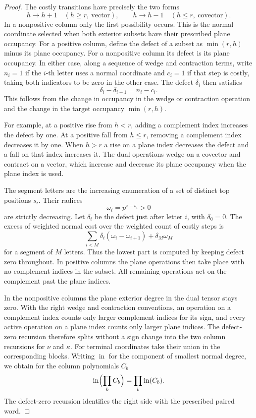 \begin{proof}
The costly transitions have precisely the two forms
\[
 h\longrightarrow h+1\quad(h\ge r,\ \text{vector}),\qquad h\longrightarrow h-1\quad(h\le r,\ \text{covector}).
\]
In a nonpositive
column only the first possibility occurs. This is the normal
coordinate selected when both exterior subsets have their
prescribed plane occupancy. For a positive column, define the
defect of a subset as \(\min(r,h)\) minus its plane occupancy.
For a nonpositive column its defect is its plane occupancy.
In either case, along a sequence of wedge and contraction
terms, write \(n_i=1\) if the \(i\)-th letter
uses a normal coordinate and \(c_i=1\) if that step is
costly, taking both indicators to be zero in the other
case. The defect \(\delta_i\) then satisfies
\[
                    \delta_i-\delta_{i-1}=n_i-c_i .
\]
This follows from the change in occupancy in the wedge
or contraction operation and the change in the target
occupancy \(\min(r,h)\).

For example, at a positive rise from \(h<r\), adding a
complement index increases the defect by one. At a positive
fall from \(h\le r\), removing a complement index decreases
it by one. When \(h>r\) a rise on a plane index decreases the
defect and a fall on that index increases it. The dual
operations wedge on a covector and contract on a vector,
which increase and decrease its plane occupancy when the
plane index is used.

The segment letters are the increasing enumeration of a set of
distinct top positions \(s_i\). Their radices
\[
 \omega_i=p^{z-s_i}>0
\]
are strictly decreasing. Let
\(\delta_i\) be the defect just after letter
\(i\), with \(\delta_0=0\). The excess of weighted normal cost
over the weighted count of costly steps is
\[
 \sum_{i<M}\delta_i(\omega_i-\omega_{i+1})+\delta_M\omega_M
\]
for a segment of \(M\) letters. Thus the lowest part is
computed by keeping defect zero throughout. In positive
columns the plane operations then take place with no
complement indices in the subset. All remaining operations
act on the complement past the plane indices.

In the
nonpositive columns the plane exterior degree in the dual
tensor stays zero. With the right wedge and contraction
conventions, an operation on a complement index counts only
larger complement indices for its sign, and every active
operation on a plane index counts only larger plane indices.
The defect-zero recursion therefore splits without a sign
change into the two column recursions for \(\nu\) and
\(\kappa\). For terminal coordinates take their union in the
corresponding blocks. Writing \(\operatorname{in}\) for the component of smallest normal degree, we obtain for the column polynomials \(C_b\)
\[
 \operatorname{in}\Bigl(\prod_b C_b\Bigr)=\prod_b\operatorname{in}(C_b).
\]
The defect-zero recursion identifies the right side with the prescribed paired word.


\end{proof}
